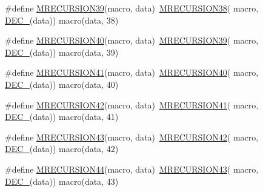\begin{DoxyCompactItemize}
\item 
\#define \mbox{\hyperlink{group__group__sam0__utils__mrecursion_ga39b95086189f23b6fab245afd2b34d76}{M\+R\+E\+C\+U\+R\+S\+I\+O\+N39}}(macro,  data)~\mbox{\hyperlink{group__group__sam0__utils__mrecursion_ga88be78dfd27dc8ef724cd937c81715ef}{M\+R\+E\+C\+U\+R\+S\+I\+O\+N38}}(  macro, \mbox{\hyperlink{group__group__sam0__utils__mrecursion_ga1d23d683797679dca8c3512a54a5dcae}{D\+E\+C\+\_\+}}(data))   macro(data, 38)
\item 
\#define \mbox{\hyperlink{group__group__sam0__utils__mrecursion_gae9edc373382a06fbc22889a81e2cd6eb}{M\+R\+E\+C\+U\+R\+S\+I\+O\+N40}}(macro,  data)~\mbox{\hyperlink{group__group__sam0__utils__mrecursion_ga39b95086189f23b6fab245afd2b34d76}{M\+R\+E\+C\+U\+R\+S\+I\+O\+N39}}(  macro, \mbox{\hyperlink{group__group__sam0__utils__mrecursion_ga1d23d683797679dca8c3512a54a5dcae}{D\+E\+C\+\_\+}}(data))   macro(data, 39)
\item 
\#define \mbox{\hyperlink{group__group__sam0__utils__mrecursion_ga18ead39c9c6dcb6c6f62f3d140bd650b}{M\+R\+E\+C\+U\+R\+S\+I\+O\+N41}}(macro,  data)~\mbox{\hyperlink{group__group__sam0__utils__mrecursion_gae9edc373382a06fbc22889a81e2cd6eb}{M\+R\+E\+C\+U\+R\+S\+I\+O\+N40}}(  macro, \mbox{\hyperlink{group__group__sam0__utils__mrecursion_ga1d23d683797679dca8c3512a54a5dcae}{D\+E\+C\+\_\+}}(data))   macro(data, 40)
\item 
\#define \mbox{\hyperlink{group__group__sam0__utils__mrecursion_ga5190bae99648624874678a2bbde2cfb9}{M\+R\+E\+C\+U\+R\+S\+I\+O\+N42}}(macro,  data)~\mbox{\hyperlink{group__group__sam0__utils__mrecursion_ga18ead39c9c6dcb6c6f62f3d140bd650b}{M\+R\+E\+C\+U\+R\+S\+I\+O\+N41}}(  macro, \mbox{\hyperlink{group__group__sam0__utils__mrecursion_ga1d23d683797679dca8c3512a54a5dcae}{D\+E\+C\+\_\+}}(data))   macro(data, 41)
\item 
\#define \mbox{\hyperlink{group__group__sam0__utils__mrecursion_ga33387af8b5d03268b41df40ecb0523db}{M\+R\+E\+C\+U\+R\+S\+I\+O\+N43}}(macro,  data)~\mbox{\hyperlink{group__group__sam0__utils__mrecursion_ga5190bae99648624874678a2bbde2cfb9}{M\+R\+E\+C\+U\+R\+S\+I\+O\+N42}}(  macro, \mbox{\hyperlink{group__group__sam0__utils__mrecursion_ga1d23d683797679dca8c3512a54a5dcae}{D\+E\+C\+\_\+}}(data))   macro(data, 42)
\item 
\#define \mbox{\hyperlink{group__group__sam0__utils__mrecursion_gaf2833cdb0675c88cbd9f2ba45d2f7f44}{M\+R\+E\+C\+U\+R\+S\+I\+O\+N44}}(macro,  data)~\mbox{\hyperlink{group__group__sam0__utils__mrecursion_ga33387af8b5d03268b41df40ecb0523db}{M\+R\+E\+C\+U\+R\+S\+I\+O\+N43}}(  macro, \mbox{\hyperlink{group__group__sam0__utils__mrecursion_ga1d23d683797679dca8c3512a54a5dcae}{D\+E\+C\+\_\+}}(data))   macro(data, 43)

\end{DoxyCompactItemize}
